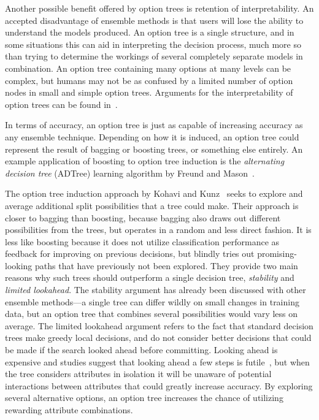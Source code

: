 Another possible benefit offered by option trees is retention of interpretability. An accepted disadvantage of ensemble methods is that users will lose the ability to understand the models produced. An option tree is a single structure, and in some situations this can aid in interpreting the decision process, much more so than trying to determine the workings of several completely separate models in combination. An option tree containing many options at many levels can be complex, but humans may not be as confused by a limited number of option nodes in small and simple option trees. Arguments for the interpretability of option trees can be found in~\cite{kohaviot,adtrees}.

In terms of accuracy, an option tree is just as capable of increasing accuracy as any ensemble technique. Depending on how it is induced, an option tree could represent the result of bagging or boosting trees, or something else entirely. An example application of boosting to option tree induction is the {\em alternating decision tree} (ADTree) learning algorithm by Freund and Mason~\cite{adtrees}.

The option tree induction approach by Kohavi and Kunz~\cite{kohaviot} seeks to explore and average additional split possibilities that a tree could make. Their approach is closer to bagging than boosting, because bagging also draws out different possibilities from the trees, but operates in a random and less direct fashion. It is less like boosting because it does not utilize classification performance as feedback for improving on previous decisions, but blindly tries out promising-looking paths that have previously not been explored. They provide two main reasons why such trees should outperform a single decision tree, {\em stability} and {\em limited lookahead}. The stability argument has already been discussed with other ensemble methods---a single tree can differ wildly on small changes in training data, but an option tree that combines several possibilities would vary less on average. The limited lookahead argument refers to the fact that standard decision trees make greedy local decisions, and do not consider better decisions that could be made if the search looked ahead before committing. Looking ahead is expensive and studies suggest that looking ahead a few steps is futile~\cite{dtlookahead}, but when the tree considers attributes in isolation it will be unaware of potential interactions between attributes that could greatly increase accuracy. By exploring several alternative options, an option tree increases the chance of utilizing rewarding attribute combinations.

